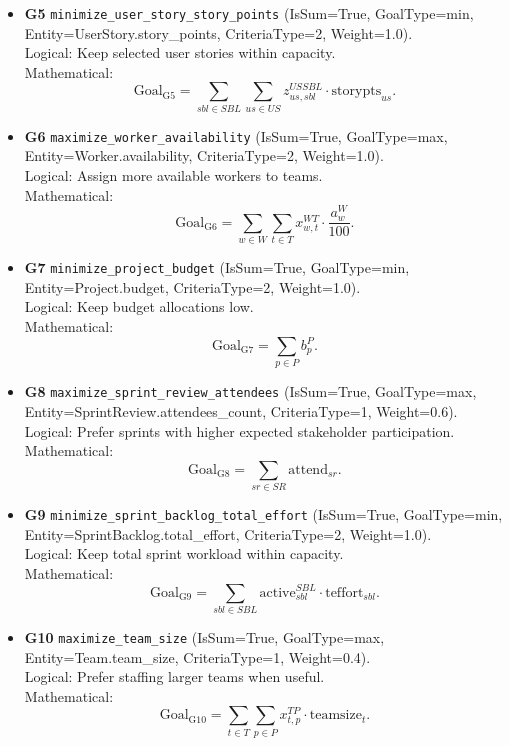 \documentclass[11pt,a4paper]{article}
\begin{document}
\begin{itemize}[leftmargin=2.2em]
  \item \textbf{G5} \texttt{minimize\_user\_story\_story\_points} (IsSum=True, GoalType=min, Entity=UserStory.story\_points, CriteriaType=2, Weight=1.0). \\
  Logical: Keep selected user stories within capacity. \\
  Mathematical:
  \[
  \text{Goal}_{\mathrm{G5}}=\sum_{sbl\in SBL}\sum_{us\in US} z^{US SBL}_{us,sbl}\cdot \text{storypts}_{us}.
  \]

  \item \textbf{G6} \texttt{maximize\_worker\_availability} (IsSum=True, GoalType=max, Entity=Worker.availability, CriteriaType=2, Weight=1.0). \\
  Logical: Assign more available workers to teams. \\
  Mathematical:
  \[
  \text{Goal}_{\mathrm{G6}}=\sum_{w\in W}\sum_{t\in T} x^{WT}_{w,t}\cdot \frac{a^{W}_{w}}{100}.
  \]

  \item \textbf{G7} \texttt{minimize\_project\_budget} (IsSum=True, GoalType=min, Entity=Project.budget, CriteriaType=2, Weight=1.0). \\
  Logical: Keep budget allocations low. \\
  Mathematical:
  \[
  \text{Goal}_{\mathrm{G7}}=\sum_{p\in P} b^{P}_{p}.
  \]

  \item \textbf{G8} \texttt{maximize\_sprint\_review\_attendees} (IsSum=True, GoalType=max, Entity=SprintReview.attendees\_count, CriteriaType=1, Weight=0.6). \\
  Logical: Prefer sprints with higher expected stakeholder participation. \\
  Mathematical:
  \[
  \text{Goal}_{\mathrm{G8}}=\sum_{sr\in SR} \text{attend}_{sr}.
  \]

  \item \textbf{G9} \texttt{minimize\_sprint\_backlog\_total\_effort} (IsSum=True, GoalType=min, Entity=SprintBacklog.total\_effort, CriteriaType=2, Weight=1.0). \\
  Logical: Keep total sprint workload within capacity. \\
  Mathematical:
  \[
  \text{Goal}_{\mathrm{G9}}=\sum_{sbl\in SBL} \text{active}^{SBL}_{sbl}\cdot \text{teffort}_{sbl}.
  \]

  \item \textbf{G10} \texttt{maximize\_team\_size} (IsSum=True, GoalType=max, Entity=Team.team\_size, CriteriaType=1, Weight=0.4). \\
  Logical: Prefer staffing larger teams when useful. \\
  Mathematical:
  \[
  \text{Goal}_{\mathrm{G10}}=\sum_{t\in T}\sum_{p\in P} x^{TP}_{t,p}\cdot \text{teamsize}_{t}.
  \]


\end{itemize}
\end{document}

